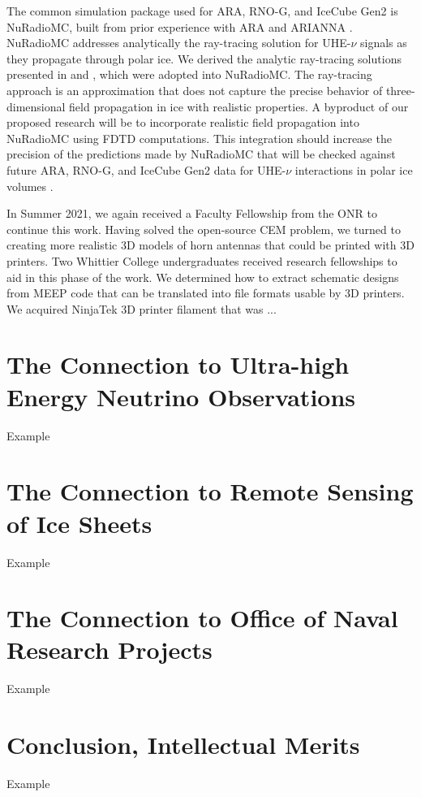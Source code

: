 \documentclass[../../main.tex]{subfiles}
\begin{document}
The common simulation package used for ARA, RNO-G, and IceCube Gen2 is NuRadioMC, built from prior experience with ARA and ARIANNA \cite{10.1140/epjc/s10052-020-7612-8,10.1109/tns.2015.2468182,10.1016/j.astropartphys.2011.11.010,Barwick:2014pca,10.1103/physrevd.102.043021}.  NuRadioMC addresses analytically the ray-tracing solution for UHE-$\nu$ signals as they propagate through polar ice.  We derived the analytic ray-tracing solutions presented in \cite{horizPaper} and \cite{10.1140/epjc/s10052-020-7612-8}, which were adopted into NuRadioMC.  The ray-tracing approach is an approximation that does not capture the precise behavior of three-dimensional field propagation in ice with realistic properties.  A byproduct of our proposed research will be to incorporate realistic field propagation into NuRadioMC using FDTD computations.  This integration should increase the precision of the predictions made by NuRadioMC that will be checked against future ARA, RNO-G, and IceCube Gen2 data for UHE-$\nu$ interactions in polar ice volumes \cite{10.22323/1.395.1217}. \\ \vspace{2.5mm}

In Summer 2021, we again received a Faculty Fellowship from the ONR to continue this work.  Having solved the open-source CEM problem, we turned to creating more realistic 3D models of horn antennas that could be printed with 3D printers.  Two Whittier College undergraduates received research fellowships to aid in this phase of the work.  We determined how to extract schematic designs from MEEP code that can be translated into file formats usable by 3D printers.  We acquired NinjaTek 3D printer filament that was ...

%

\section{The Connection to Ultra-high Energy Neutrino Observations}
\label{sec:askaryan}

Example

\section{The Connection to Remote Sensing of Ice Sheets}
\label{sec:cresis}

Example

\section{The Connection to Office of Naval Research Projects}
\label{sec:onr}

Example

\section{Conclusion, Intellectual Merits}
\label{sec:conc_im}

Example
\end{document}
